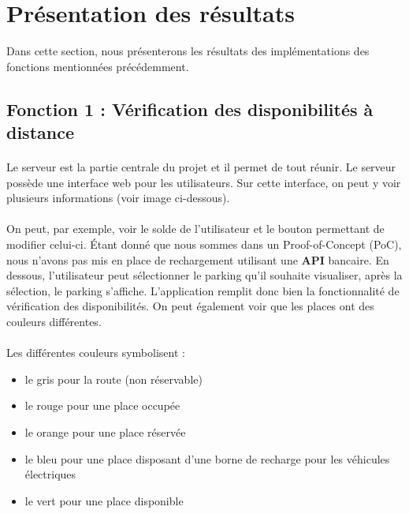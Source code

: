 \section{Présentation des résultats}

Dans cette section, nous présenterons les résultats des implémentations des fonctions mentionnées précédemment.


\subsection{Fonction 1 : Vérification des disponibilités à distance}


\paragraph*{}
Le serveur est la partie centrale du projet et il permet de tout réunir. Le serveur possède une interface web pour les utilisateurs. Sur cette interface, on peut y voir plusieurs informations (voir image ci-dessous).


\paragraph*{}
On peut, par exemple, voir le solde de l'utilisateur et le bouton permettant de modifier celui-ci. Étant donné que nous sommes dans un Proof-of-Concept (PoC), nous n'avons pas mis en place de rechargement utilisant une \textbf{API} bancaire.
En dessous, l'utilisateur peut sélectionner le parking qu'il souhaite visualiser, après la sélection, le parking s'affiche. L'application remplit donc bien la fonctionnalité de vérification des disponibilités. On peut également voir que les places ont des couleurs différentes.

\paragraph*{}
Les différentes couleurs symbolisent :
\begin{itemize}
    \item le gris pour la route (non réservable)
    \item le rouge pour une place occupée
    \item le orange pour une place réservée
    \item le bleu pour une place disposant d'une borne de recharge pour les véhicules électriques
    \item le vert pour une place disponible
\end{itemize}

